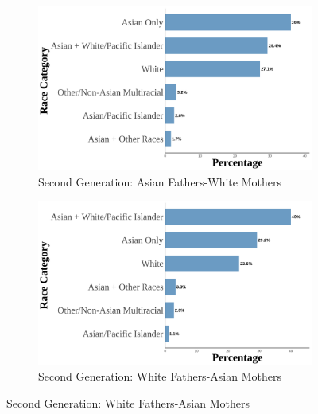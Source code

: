 \begin{landscape}
\begin{figure}[!htb]
\begin{subfigure}{.48\textwidth}
\caption{Second Generation: Asian Fathers-White Mothers}
\centering
\includegraphics[width=1\linewidth]{histogram_asian_american_race_secondgen_AW.png}
\end{subfigure}
\hfill
\begin{subfigure}{.48\textwidth}
\caption{Second Generation: White Fathers-Asian Mothers}
\centering
\includegraphics[width=1\linewidth]{histogram_asian_american_race_secondgen_WA.png}
\end{subfigure}


\end{figure}
\end{landscape}
